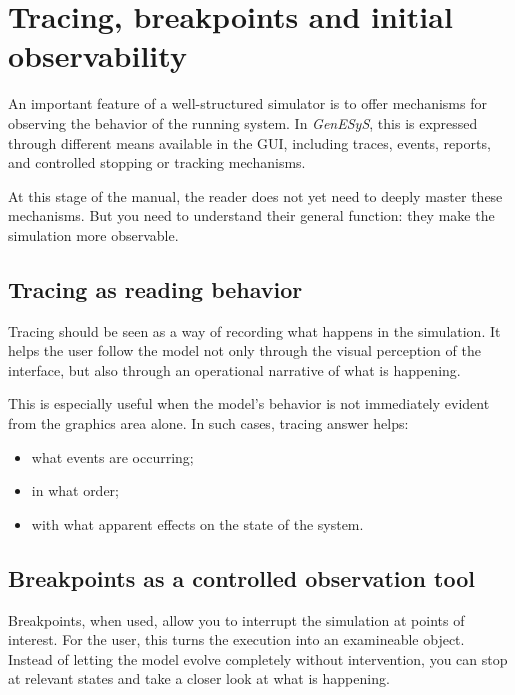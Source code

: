 \section{Tracing, breakpoints and initial observability}
\label{sec:cap5_tracing_breakpoints_observabilidade}

An important feature of a well-structured simulator is to offer mechanisms for observing the behavior of the running system. In \textit{GenESyS}, this is expressed through different means available in the GUI, including traces, events, reports, and controlled stopping or tracking mechanisms.

At this stage of the manual, the reader does not yet need to deeply master these mechanisms. But you need to understand their general function: they make the simulation more observable.

\subsection{Tracing as reading behavior}
\label{subsec:cap5_tracing_leitura_comportamento}

Tracing should be seen as a way of recording what happens in the simulation. It helps the user follow the model not only through the visual perception of the interface, but also through an operational narrative of what is happening.

This is especially useful when the model's behavior is not immediately evident from the graphics area alone. In such cases, tracing answer helps:
\begin{itemize}
\item what events are occurring;
\item in what order;
\item with what apparent effects on the state of the system.
\end{itemize}

\subsection{Breakpoints as a controlled observation tool}
\label{subsec:cap5_breakpoints_observacao_controlada}

Breakpoints, when used, allow you to interrupt the simulation at points of interest. For the user, this turns the execution into an examineable object. Instead of letting the model evolve completely without intervention, you can stop at relevant states and take a closer look at what is happening.

